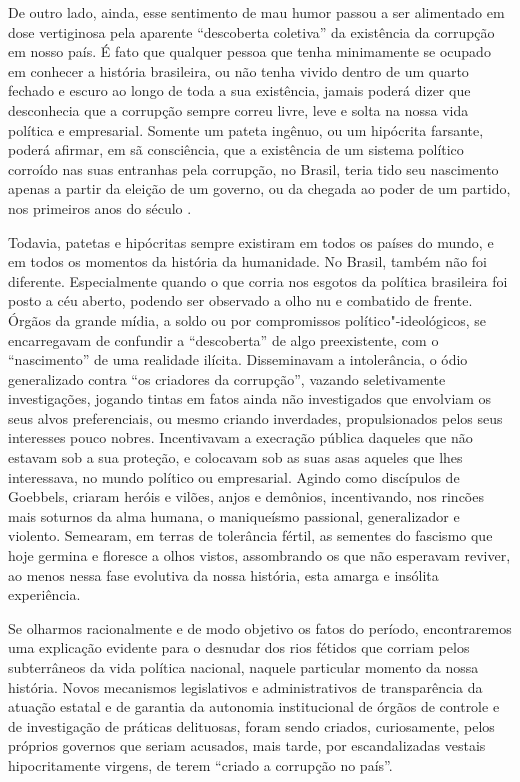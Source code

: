 De outro lado, ainda, esse sentimento de mau humor passou a ser
alimentado em dose vertiginosa pela aparente ``descoberta coletiva'' da
existência da corrupção em nosso país. É fato que qualquer pessoa que
tenha minimamente se ocupado em conhecer a história brasileira, ou não
tenha vivido dentro de um quarto fechado e escuro ao longo de toda a sua
existência, jamais poderá dizer que desconhecia que a corrupção sempre
correu livre, leve e solta na nossa vida política e empresarial.
Somente um pateta ingênuo, ou um hipócrita farsante, poderá afirmar, em
sã consciência, que a existência de um sistema político corroído nas
suas entranhas pela corrupção, no Brasil, teria tido seu nascimento
apenas a partir da eleição de um governo, ou da chegada ao poder de um
partido, nos primeiros anos do século .

Todavia, patetas e hipócritas sempre existiram em todos os países do
mundo, e em todos os momentos da história da humanidade. No Brasil,
também não foi diferente. Especialmente quando o que corria nos esgotos
da política brasileira foi posto a céu aberto, podendo ser observado a
olho nu e combatido de frente. Órgãos da grande mídia, a soldo ou por
compromissos político"-ideológicos, se encarregavam de confundir a
``descoberta'' de algo preexistente, com o ``nascimento'' de uma
realidade ilícita. Disseminavam a intolerância, o ódio generalizado
contra ``os criadores da corrupção'', vazando seletivamente
investigações, jogando tintas em fatos ainda não investigados que
envolviam os seus alvos preferenciais, ou mesmo criando inverdades,
propulsionados pelos seus interesses pouco nobres. Incentivavam a
execração pública daqueles que não estavam sob a sua proteção, e
colocavam sob as suas asas aqueles que lhes interessava, no mundo
político ou empresarial. Agindo como discípulos de Goebbels, criaram
heróis e vilões, anjos e demônios, incentivando, nos rincões mais
soturnos da alma humana, o maniqueísmo passional, generalizador e
violento. Semearam, em terras de tolerância fértil, as sementes do
fascismo que hoje germina e floresce a olhos vistos, assombrando os que
não esperavam reviver, ao menos nessa fase evolutiva da nossa história,
esta amarga e insólita experiência.

Se olharmos racionalmente e de modo objetivo os fatos do período,
encontraremos uma explicação evidente para o desnudar dos rios fétidos
que corriam pelos subterrâneos da vida política nacional, naquele
particular momento da nossa história. Novos mecanismos legislativos e
administrativos de transparência da atuação estatal e de garantia da
autonomia institucional de órgãos de controle e de investigação de
práticas delituosas, foram sendo criados, curiosamente, pelos próprios
governos que seriam acusados, mais tarde, por escandalizadas vestais
hipocritamente virgens, de terem ``criado a corrupção no país''.

